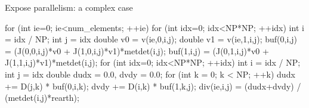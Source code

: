 \documentclass[8pt,NM,theme=angles,number=2023-00000]{sandia-beamer}
\begin{document}
\begin{frame}[fragile]{Expose parallelism: a complex case}
  \begin{semiverbatim} \small
  for (int ie=0; ie<num_elements; ++ie) {
    for (int idx=0; idx<NP*NP; ++idx) {
      int i = idx / NP; int j = idx %
      double v0 = v(ie,0,i,j); double v1 = v(ie,1,i,j);
      buf(0,i,j) = (J(0,0,i,j)*v0 + J(1,0,i,j)*v1)*metdet(i,j);
      buf(1,i,j) = (J(0,1,i,j)*v0 + J(1,1,i,j)*v1)*metdet(i,j);
    }
    for (int idx=0; idx<NP*NP; ++idx) {
      int i = idx / NP; int j = idx %
      double dudx = 0.0, dvdy = 0.0;
      for (int k = 0; k < NP; ++k) {
        dudx += D(j,k) * buf(0,i,k);
        dvdy += D(i,k) * buf(1,k,j);
      }
      div(ie,i,j) = (dudx+dvdy) / (metdet(i,j)*rearth);
    }
  }
  \end{semiverbatim}
\end{frame}
\end{document}
